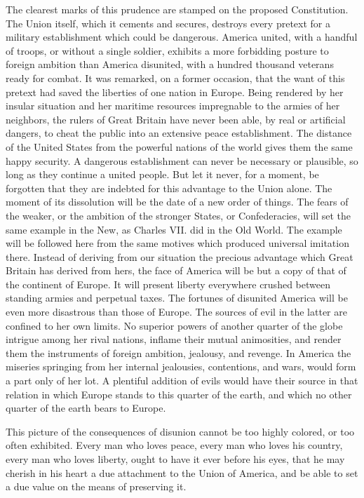 The clearest marks of this prudence are stamped on the proposed Constitution. 
The Union itself, which it cements and secures, destroys every pretext for a military establishment which could be dangerous. 
America united, with a handful of troops, or without a single soldier, exhibits a more forbidding posture to foreign ambition than America disunited, with a hundred thousand veterans ready for combat. 
It was remarked, on a former occasion, that the want of this pretext had saved the liberties of one nation in Europe. 
Being rendered by her insular situation and her maritime resources impregnable to the armies of her neighbors, the rulers of Great Britain have never been able, by real or artificial dangers, to cheat the public into an extensive peace establishment. 
The distance of the United States from the powerful nations of the world gives them the same happy security. 
A dangerous establishment can never be necessary or plausible, so long as they continue a united people. 
But let it never, for a moment, be forgotten that they are indebted for this advantage to the Union alone. 
The moment of its dissolution will be the date of a new order of things. 
The fears of the weaker, or the ambition of the stronger States, or Confederacies, will set the same example in the New, as Charles VII. 
did in the Old World. 
The example will be followed here from the same motives which produced universal imitation there. 
Instead of deriving from our situation the precious advantage which Great Britain has derived from hers, the face of America will be but a copy of that of the continent of Europe. 
It will present liberty everywhere crushed between standing armies and perpetual taxes. 
The fortunes of disunited America will be even more disastrous than those of Europe. 
The sources of evil in the latter are confined to her own limits. 
No superior powers of another quarter of the globe intrigue among her rival nations, inflame their mutual animosities, and render them the instruments of foreign ambition, jealousy, and revenge. 
In America the miseries springing from her internal jealousies, contentions, and wars, would form a part only of her lot. 
A plentiful addition of evils would have their source in that relation in which Europe stands to this quarter of the earth, and which no other quarter of the earth bears to Europe.

This picture of the consequences of disunion cannot be too highly colored, or too often exhibited. 
Every man who loves peace, every man who loves his country, every man who loves liberty, ought to have it ever before his eyes, that he may cherish in his heart a due attachment to the Union of America, and be able to set a due value on the means of preserving it.

